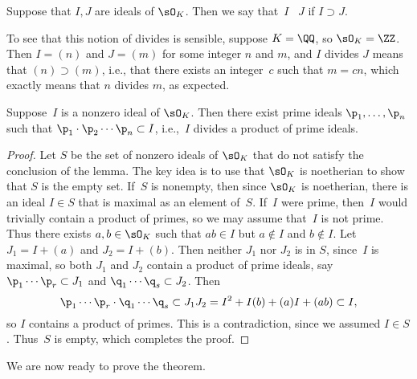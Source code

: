 \begin{definition}
  Suppose that $I,J$ are ideals of $\sO_K$.
  Then we say that~$I$ ~$J$ if $I\supset J$.
\end{definition}
To see that this notion of divides is sensible, suppose $K=\QQ$, so
$\sO_K=\ZZ$.  Then $I=(n)$ and $J=(m)$ for some integer $n$ and $m$, and
$I$ divides $J$ means that $(n)\supset (m)$, i.e., that there exists
an integer~$c$ such that $m=cn$, which exactly means that $n$ divides
$m$, as expected.

\begin{lemma}\label{lem:divprod}
  Suppose~$I$ is a nonzero ideal of $\sO_K$.  Then there exist prime ideals
  $\p_1,\dots, \p_n$ such that $\p_1 \cdot \p_2 \cdots \p_n \subset I$,
  i.e.,~$I$ divides a product of prime ideals.
\end{lemma}
\begin{proof}
  Let $S$ be the set of nonzero ideals of $\sO_K$ that do not
  satisfy the conclusion
  of the lemma.  The key idea is to use that $\sO_K$ is noetherian to show that
  $S$ is the empty set.   If~$S$ is
  nonempty, then since $\sO_K$ is noetherian, there is an ideal
  $I\in S$ that is maximal as an element of~$S$.  If~$I$ were prime, then~$I$
  would trivially contain a product of primes, so we may assume that~$I$
  is not prime.  Thus there exists $a,b\in \sO_K$ such that $ab\in
  I$ but $a\not\in I$ and $b\not\in I$.  Let $J_1 = I+(a)$ and
  $J_2=I+(b)$.  Then neither $J_1$ nor $J_2$ is in $S$, since~$I$ is
  maximal, so both $J_1$ and $J_2$ contain a product of prime ideals,
  say $\p_1 \cdots \p_r \subset J_1$ and $\q_1\cdots \q_s \subset J_2$.
  Then
  $$
    \p_1  \cdots \p_r \cdot \q_1\cdots \q_s \subset
    J_1 J_2 = I^2 + I(b) + (a)I + (ab) \subset I,
  $$
  so $I$ contains a product of primes.  This is a contradiction,
  since we assumed $I\in S$.   Thus~$S$ is empty, which completes
  the proof.
\end{proof}
We are now ready to prove the theorem.


